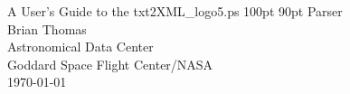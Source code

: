 %
\thispagestyle{empty}
\dblesp

%
\noindent
\begin{center}
%
{\Huge
A User's Guide to the 
\mongovaryboth txt2XML_logo5.ps 100pt 90pt
Parser \\[2.5cm]  
}
%
\snglsp
{\Large
Brian Thomas \\[0.5 cm] 
Astronomical Data Center \\ 
Goddard Space Flight Center/NASA\\[1.5 cm]
}
%
\today
%
\end{center}
%
%
